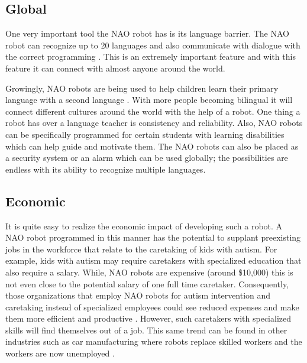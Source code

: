 \subsection{Global}
One very important tool the NAO robot has is its language barrier. The NAO robot can recognize up to 20 languages and also communicate with dialogue with the correct programming \cite{softbank}. This is an extremely important feature and with this feature it can connect with almost anyone around the world.\par

Growingly, NAO robots are being used to help children learn their primary language with a second language \cite{hodson_2015}. With more people becoming bilingual it will connect different cultures around the world with the help of a robot. One thing a robot has over a language teacher is consistency and reliability. Also, NAO robots can be specifically programmed for certain students with learning disabilities which can help guide and motivate them. The NAO robots can also be placed as a security system or an alarm which can be used globally; the possibilities are endless with its ability to recognize multiple languages. \par

\subsection{Economic}
It is quite easy to realize the economic impact of developing such a robot. A NAO robot programmed in this manner has the potential to supplant preexisting jobs in the workforce that relate to the caretaking of kids with autism. For example, kids with autism may require caretakers with specialized education that also require a salary. While, NAO robots are expensive (around \$10,000) this is not even close to the potential salary of one full time caretaker. Consequently, those organizations that employ NAO robots for autism intervention and caretaking instead of specialized employees could see reduced expenses and make them more efficient and productive \cite{Acemoglu2020RobotsAJ}. However, such caretakers with specialized skills will find themselves out of a job. This same trend can be found in other industries such as car manufacturing where robots replace skilled workers and the workers are now unemployed \cite{Acemoglu2020RobotsAJ}. \par

